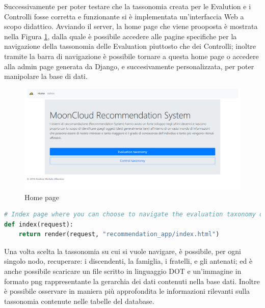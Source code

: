 \newpage

Successivamente per poter testare che la tassonomia creata per le Evalution e i Controlli fosse corretta e funzionante si è 
implementata un'interfaccia Web a scopo didattico.
Avviando il server, la home page che viene prooposta è mostrata nella Figura \ref{fig:MCRS_homepage}, dalla quale è possibile 
accedere alle pagine specifiche per la navigazione della tassonomia delle Evaluation piuttosto che dei Controlli; inoltre 
tramite la barra di navigazione è possibile tornare a questa home page o accedere alla admin page generata da Django, e
succesivamente personalizzata, per poter manipolare la base di dati.\\

\begin{figure}[ht!]
	\includegraphics[scale=0.3]{images/MCRS_homepage.png}
	\caption{Home page}
	\label{fig:MCRS_homepage}
\end{figure}

\lstset{style=python_code_style}
\label{lst:view_homepage}
\begin{lstlisting}[language=Python, caption={Parte principale del codice delle View della soluzione per gestire l'accesso
	alla home page}]
# Index page where you can choose to navigate the evaluation taxonomy or the control taxonomy
def index(request):
	return render(request, "recommendation_app/index.html")
\end{lstlisting}


Una volta scelta la tassonomia su cui si vuole navigare, è possibile, per ogni singolo nodo, recuperare: i 
discendenti, la famiglia, i fratelli, e gli antenati; ed è anche possibile scaricare un file scritto in linguaggio
DOT e un'immagine in formato png rappresentante la gerarchia dei dati contenuti nella base dati. 
Inoltre è possibile osservare in maniera più approfondita le informazioni rilevanti sulla tassonomia contenute nelle tabelle
del database.\\

